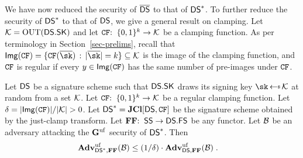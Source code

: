 %		
%		
%		

 We have now reduced the security of $\overline{\mathsf{DS}}$ to that of $\mathsf{DS}^*$. To further reduce the security of $\mathsf{DS}^*$ to that of $\mathsf{DS}$, we give a general result on clamping. Let ${\cal K} = \mathrm{OUT}(\mathsf{DS}.\mathsf{SK})$ and let $\mathtt{CF}{:\;\;}\{0,1\}^k\to{\cal K}$ be a clamping function. As per terminology in Section~\ref{sec-prelims}, recall that $\Img(\CFEDSA) = \set{\CFEDSA(\osk)}{|\osk|=k}\subseteq \keySet$  is the image of the clamping function, and $\mathtt{CF}$ is {regular} if every $y\in\mathsf{Img}(\mathtt{CF})$ has the same number of pre-images under $\mathtt{CF}$.


\begin{theorem}\label{th-jc} Let $\mathsf{DS}$ be a signature scheme such that $\mathsf{DS}.\mathsf{SK}$ draws its signing key $\sk\getsr\keySet$ at random from a set ${\cal K}$.
 Let $\mathtt{CF}{:\;\;}\{0,1\}^k\to{\cal K}$ be a regular clamping function. Let $\delta = |\mathsf{Img}(\mathtt{CF})|/|{\cal K}| > 0$. Let $\mathsf{DS}^* = \mathbf{JCl}[\mathsf{DS},\mathtt{CF}]$ be the signature scheme obtained by the just-clamp transform. Let $\mathbf{FF}{:\;\;}\mathsf{SS}\to \mathsf{DS}.\mathsf{FS}$ be any functor.  Let $\mathcal{B}$ be an adversary attacking the $\mathbf{G}^{\mathrm{uf}}$ security of $\mathsf{DS}^*$. Then %
\begin{align*}
	\mathbf{Adv}^{\mathrm{uf}}_{\mathsf{DS}^*,\mathbf{FF}}(\mathcal{B}) &\leq  (1/\delta)\cdot \mathbf{Adv}^{\mathrm{uf}}_{\mathsf{DS},\mathbf{FF}}(\mathcal{B}) \;.
\end{align*}
\end{theorem}

